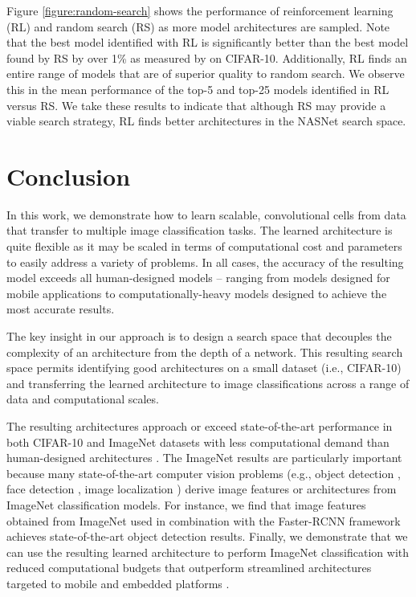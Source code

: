 \documentclass[10pt,twocolumn,letterpaper]{article}
\begin{document}
Figure \ref{figure:random-search} shows the performance of reinforcement learning (RL) and random search (RS) as more model architectures are sampled. Note that the best model identified with RL is significantly better than the best model found by RS by over 1\% as measured by on CIFAR-10. Additionally, RL finds an entire range of models that are of superior quality to random search. We observe this in the mean performance of the top-5 and top-25 models identified in RL versus RS.
We take these results to indicate that although RS may provide a viable search strategy, RL finds better architectures in the NASNet search space.
\section{Conclusion}
In this work, we demonstrate how to learn scalable, convolutional cells from data that transfer to multiple image classification tasks. The learned architecture is quite flexible as it may be scaled in terms of computational cost and parameters to easily address a variety of problems. In all cases, the accuracy of the resulting model exceeds all human-designed models -- ranging from models designed for mobile applications to computationally-heavy models designed to achieve the most accurate results.

The key insight in our approach is to design a search space that decouples the complexity of an architecture from the depth of a network. This resulting search space permits identifying good architectures on a small dataset (i.e., CIFAR-10) and transferring the learned architecture to image classifications across a range of data and computational scales.

The resulting architectures approach or exceed state-of-the-art performance in both CIFAR-10 and ImageNet datasets with less computational demand than human-designed architectures \cite{szegedy2016rethinking,BatchNorm,zhang2016polynet}. The ImageNet results are particularly important because many state-of-the-art computer vision problems (e.g.,  object detection \cite{huang2016speed}, face detection \cite{schroff2015facenet}, image localization \cite{weyand2016planet}) derive image features or architectures from ImageNet classification models. For instance, we find that image features obtained from ImageNet used in combination with the Faster-RCNN framework achieves state-of-the-art object detection results. Finally, we demonstrate that we can use the resulting learned architecture to perform ImageNet classification with reduced computational budgets that outperform streamlined architectures targeted to mobile and embedded platforms \cite{howard2017mobilenets, shufflenet}.
\end{document}
